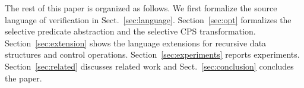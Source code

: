 
The rest of this paper is organized as follows. 
We first formalize the source language of verification in
Sect.~\ref{sec:language}.  Section~\ref{sec:opt} formalizes the
selective predicate abstraction and the selective CPS transformation.
Section~\ref{sec:extension} shows the language extensions for recursive
data structures and control operations.  Section~\ref{sec:experiments}
reports experiments.  Section~\ref{sec:related} discusses related work
and Sect.~\ref{sec:conclusion} concludes the paper.














